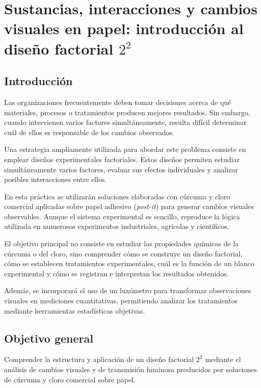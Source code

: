 \section{\texorpdfstring{Sustancias, interacciones y cambios visuales en papel: introducción al diseño factorial \(2^2\)}{Sustancias, interacciones y cambios visuales en papel: introducción al diseño factorial 2 por 2}}

\subsection{Introducción}

Las organizaciones frecuentemente deben tomar decisiones acerca de qué materiales, procesos o tratamientos producen mejores resultados. Sin embargo, cuando intervienen varios factores simultáneamente, resulta difícil determinar cuál de ellos es responsable de los cambios observados.

Una estrategia ampliamente utilizada para abordar este problema consiste en emplear diseños experimentales factoriales. Estos diseños permiten estudiar simultáneamente varios factores, evaluar sus efectos individuales y analizar posibles interacciones entre ellos.

En esta práctica se utilizarán soluciones elaboradas con cúrcuma y cloro comercial aplicadas sobre papel adhesivo (\textit{post-it}) para generar cambios visuales observables. Aunque el sistema experimental es sencillo, reproduce la lógica utilizada en numerosos experimentos industriales, agrícolas y científicos.

El objetivo principal no consiste en estudiar las propiedades químicas de la cúrcuma o del cloro, sino comprender cómo se construye un diseño factorial, cómo se establecen tratamientos experimentales, cuál es la función de un blanco experimental y cómo se registran e interpretan los resultados obtenidos.

Además, se incorporará el uso de un luxómetro para transformar observaciones visuales en mediciones cuantitativas, permitiendo analizar los tratamientos mediante herramientas estadísticas objetivas.

\subsection{Objetivo general}

Comprender la estructura y aplicación de un diseño factorial $2^2$ mediante el análisis de cambios visuales y de transmisión luminosa producidos por soluciones de cúrcuma y cloro comercial sobre papel.

